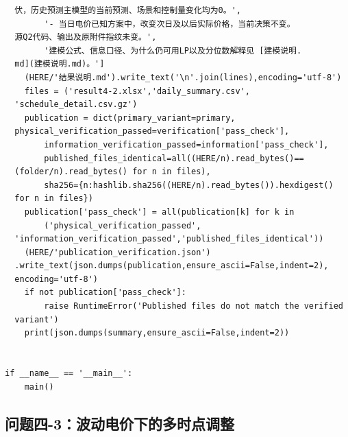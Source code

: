 \begin{verbatim}
  伏，历史预测主模型的当前预测、场景和控制量变化均为0。',
        '- 当日电价已知方案中，改变次日及以后实际价格，当前决策不变。
  源Q2代码、输出及原附件指纹未变。',
        '建模公式、信息口径、为什么仍可用LP以及分位数解释见 [建模说明.
  md](建模说明.md)。']
    (HERE/'结果说明.md').write_text('\n'.join(lines),encoding='utf-8')
    files = ('result4-2.xlsx','daily_summary.csv',
  'schedule_detail.csv.gz')
    publication = dict(primary_variant=primary,
  physical_verification_passed=verification['pass_check'],
        information_verification_passed=information['pass_check'],
        published_files_identical=all((HERE/n).read_bytes()==
  (folder/n).read_bytes() for n in files),
        sha256={n:hashlib.sha256((HERE/n).read_bytes()).hexdigest()
  for n in files})
    publication['pass_check'] = all(publication[k] for k in
        ('physical_verification_passed',
  'information_verification_passed','published_files_identical'))
    (HERE/'publication_verification.json')
  .write_text(json.dumps(publication,ensure_ascii=False,indent=2),
  encoding='utf-8')
    if not publication['pass_check']:
        raise RuntimeError('Published files do not match the verified
  variant')
    print(json.dumps(summary,ensure_ascii=False,indent=2))


if __name__ == '__main__':
    main()
\end{verbatim}

\subsection{问题四-3：波动电价下的多时点调整}

